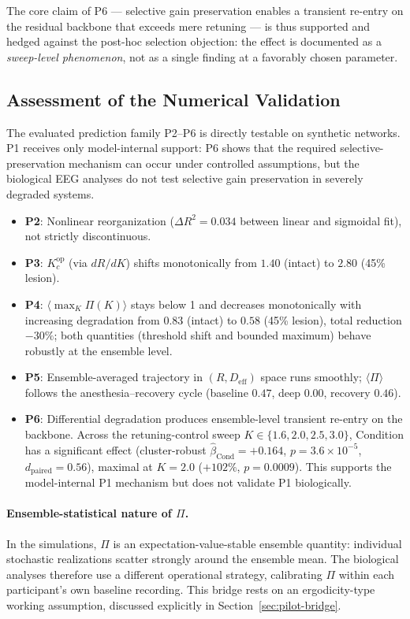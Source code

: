\documentclass[11pt,a4paper]{article}
\theoremstyle{plain}
\theoremstyle{definition}
\theoremstyle{remark}
\begin{document}
The core claim of P6 --- selective gain preservation enables a transient re-entry on the residual backbone that exceeds mere retuning --- is thus supported and hedged against the post-hoc selection objection: the effect is documented as a \emph{sweep-level phenomenon}, not as a single finding at a favorably chosen parameter.

\subsection{Assessment of the Numerical Validation}

The evaluated prediction family P2--P6 is directly testable on synthetic networks. P1 receives only model-internal support: P6 shows that the required selective-preservation mechanism can occur under controlled assumptions, but the biological EEG analyses do not test selective gain preservation in severely degraded systems.

\begin{itemize}
  \item \textbf{P2}: Nonlinear reorganization ($\Delta R^2 = 0.034$ between linear and sigmoidal fit), not strictly discontinuous.
  \item \textbf{P3}: $K_c^{\mathrm{op}}$ (via $dR/dK$) shifts monotonically from $1.40$ (intact) to $2.80$ (45\% lesion).
  \item \textbf{P4}: $\langle\max_K \Pi(K)\rangle$ stays below 1 and decreases monotonically with increasing degradation from $0.83$ (intact) to $0.58$ (45\% lesion), total reduction $-30\%$; both quantities (threshold shift and bounded maximum) behave robustly at the ensemble level.
  \item \textbf{P5}: Ensemble-averaged trajectory in $(R, D_{\mathrm{eff}})$ space runs smoothly; $\langle \Pi \rangle$ follows the anesthesia--recovery cycle (baseline $0.47$, deep $0.00$, recovery $0.46$).
  \item \textbf{P6}: Differential degradation produces ensemble-level transient re-entry on the backbone. Across the retuning-control sweep $K \in \{1.6, 2.0, 2.5, 3.0\}$, Condition has a significant effect (cluster-robust $\hat{\beta}_{\mathrm{Cond}} = +0.164$, $p = 3.6 \times 10^{-5}$, $d_{\mathrm{paired}} = 0.56$), maximal at $K = 2.0$ ($+102\%$, $p = 0.0009$). This supports the model-internal P1 mechanism but does not validate P1 biologically.
\end{itemize}

\paragraph{Ensemble-statistical nature of $\Pi$.} In the simulations, $\Pi$ is an expectation-value-stable ensemble quantity: individual stochastic realizations scatter strongly around the ensemble mean. The biological analyses therefore use a different operational strategy, calibrating $\Pi$ within each participant's own baseline recording. This bridge rests on an ergodicity-type working assumption, discussed explicitly in Section~\ref{sec:pilot-bridge}.
\end{document}
